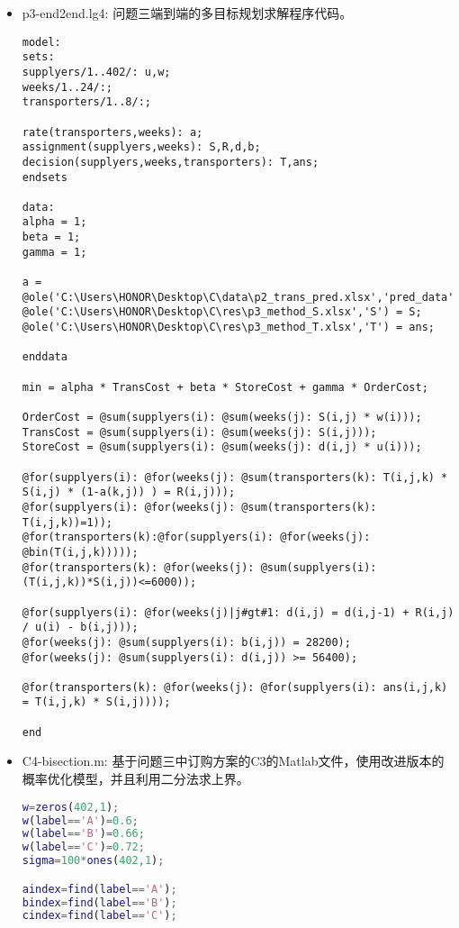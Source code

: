 \documentclass{my_paper}
\begin{document}
\begin{itemize}
\begin{lstlisting}[language={Matlab}]
\end{lstlisting}

\item p3-end2end.lg4: 问题三端到端的多目标规划求解程序代码。

\begin{lstlisting}
model:
sets:
supplyers/1..402/: u,w;
weeks/1..24/:;
transporters/1..8/:;

rate(transporters,weeks): a;
assignment(supplyers,weeks): S,R,d,b;
decision(supplyers,weeks,transporters): T,ans; 
endsets

data:
alpha = 1;
beta = 1;
gamma = 1;

a = @ole('C:\Users\HONOR\Desktop\C\data\p2_trans_pred.xlsx','pred_data');
@ole('C:\Users\HONOR\Desktop\C\res\p3_method_S.xlsx','S') = S;
@ole('C:\Users\HONOR\Desktop\C\res\p3_method_T.xlsx','T') = ans;

enddata

min = alpha * TransCost + beta * StoreCost + gamma * OrderCost;

OrderCost = @sum(supplyers(i): @sum(weeks(j): S(i,j) * w(i)));
TransCost = @sum(supplyers(i): @sum(weeks(j): S(i,j)));
StoreCost = @sum(supplyers(i): @sum(weeks(j): d(i,j) * u(i)));

@for(supplyers(i): @for(weeks(j): @sum(transporters(k): T(i,j,k) * S(i,j) * (1-a(k,j)) ) = R(i,j)));
@for(supplyers(i): @for(weeks(j): @sum(transporters(k): T(i,j,k))=1));
@for(transporters(k):@for(supplyers(i): @for(weeks(j): @bin(T(i,j,k))))); 
@for(transporters(k): @for(weeks(j): @sum(supplyers(i): (T(i,j,k))*S(i,j))<=6000));
  
@for(supplyers(i): @for(weeks(j)|j#gt#1: d(i,j) = d(i,j-1) + R(i,j) / u(i) - b(i,j)));
@for(weeks(j): @sum(supplyers(i): b(i,j)) = 28200); 
@for(weeks(j): @sum(supplyers(i): d(i,j)) >= 56400);

@for(transporters(k): @for(weeks(j): @for(supplyers(i): ans(i,j,k) = T(i,j,k) * S(i,j)))); 

end
\end{lstlisting}
\item C4-bisection.m: 基于问题三中订购方案的C3的Matlab文件，使用改进版本的概率优化模型，并且利用二分法求上界。

\begin{lstlisting}[language={Matlab}]
w=zeros(402,1);
w(label=='A')=0.6;
w(label=='B')=0.66;
w(label=='C')=0.72;
sigma=100*ones(402,1);

aindex=find(label=='A');
bindex=find(label=='B');
cindex=find(label=='C');



\end{lstlisting}
\end{itemize}
\end{document}
